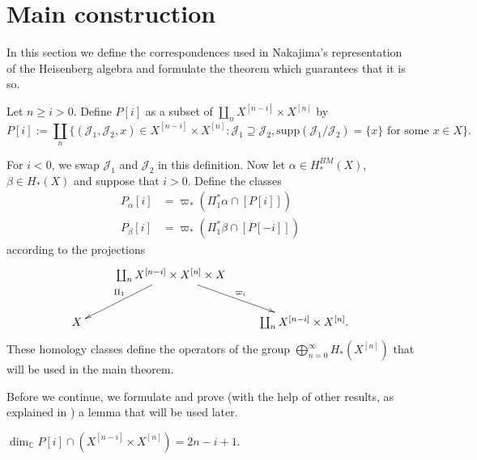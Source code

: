 \section{Main construction}
\label{section-main-construction}

\noindent
In this section we define the
correspondences used in Nakajima's
representation
of the Heisenberg algebra and formulate
the theorem which guarantees that it is so.

Let $n\geq i>0$. Define $P[i]$
as a subset of
$\coprod_nX^{[n-i]}\times X^{[n]}$
by
$$
P[i]:=\coprod_n
\{(\mathcal{J}_1,\mathcal{J}_2,x)
\in X^{[n-i]}\times X^{[n]}:
\mathcal{J}_1 \supseteq \mathcal{J}_2,
\text{supp}(\mathcal{J}_1/\mathcal{J}_2)=\{x\}
\text{ for some }x \in X\}.
$$

\noindent
For $i<0$, we swap $\mathcal{J}_1$ and
$\mathcal{J}_2$
in this definition.
Now let
$\alpha \in H_*^{BM}(X)$, $\beta \in H_*(X)$
and suppose that $i>0$. Define the classes
\begin{equation}
\label{equation-correspondence-p}
\begin{aligned}
P_\alpha[i]&=\varpi_*(\Pi_1^*\alpha \cap
[P[i]])\\
P_\beta[i]&=\varpi_*(\Pi_1^*\beta \cap
[P[-i]])
\end{aligned}
\end{equation}
according to the projections
$$
\xymatrix{
&  \coprod_n X^{[n-i]}\times X^{[n]}\times X
\ar[dl]_{\Pi_1}\ar[dr]^{\varpi_i}\\
X&&\coprod_n X^{[n-i]}\times X^{[n]}.
}
$$
These homology classes define the operators
of the group
$\bigoplus_{n=0}^{\infty}H_*(X^{[n]})$
that will be used in the main theorem.

\medskip\noindent
Before we continue, we formulate and
prove (with the help of other results,
as explained in \cite[Section
8.3]{Nakajima-lectures})
a lemma that will be used later.

\begin{lemma}
\label{lemma-dimension}
$\dim_\mathbb{C}P[i]\cap (X^{[n-i]}\times
X^{[n]})=2n-i+1$.
\end{lemma}

